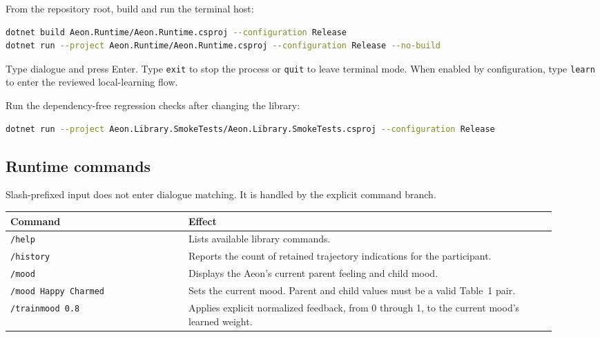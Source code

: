 \documentclass[11pt,a4paper]{article}
\begin{document}
From the repository root, build and run the terminal host:

\begin{minipage}{\linewidth}
\begin{lstlisting}[language=bash]
dotnet build Aeon.Runtime/Aeon.Runtime.csproj --configuration Release
dotnet run --project Aeon.Runtime/Aeon.Runtime.csproj --configuration Release --no-build
\end{lstlisting}
\end{minipage}

Type dialogue and press Enter. Type \texttt{exit} to stop the process or \texttt{quit} to leave terminal mode. When enabled by configuration, type \texttt{learn} to enter the reviewed local-learning flow.

Run the dependency-free regression checks after changing the library:

\begin{minipage}{\linewidth}
\begin{lstlisting}[language=bash]
dotnet run --project Aeon.Library.SmokeTests/Aeon.Library.SmokeTests.csproj --configuration Release
\end{lstlisting}
\end{minipage}

\subsection{Runtime commands}

Slash-prefixed input does not enter dialogue matching. It is handled by the explicit command branch.

\begin{longtable}{p{0.30\linewidth}p{0.62\linewidth}}
\toprule
Command & Effect \\
\midrule
\endhead
\texttt{/help} & Lists available library commands. \\
\texttt{/history} & Reports the count of retained trajectory indications for the participant. \\
\texttt{/mood} & Displays the Aeon's current parent feeling and child mood. \\
\texttt{/mood Happy Charmed} & Sets the current mood. Parent and child values must be a valid Table~1 pair. \\
\texttt{/trainmood 0.8} & Applies explicit normalized feedback, from 0 through 1, to the current mood's learned weight. \\
\bottomrule
\end{longtable}
\end{document}
